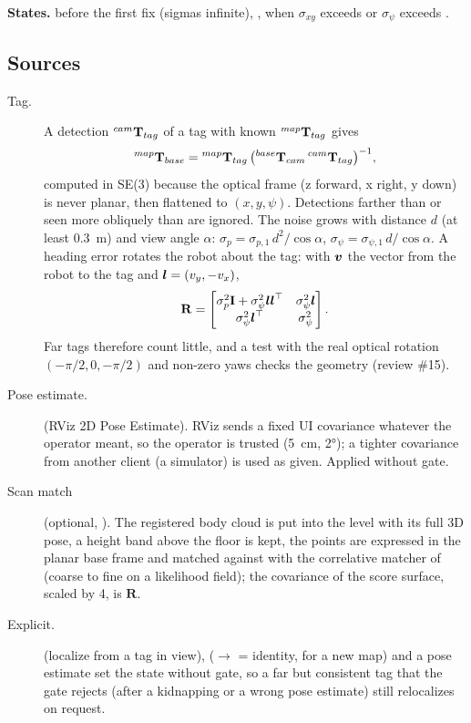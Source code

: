 \textbf{States.}  before the first fix (sigmas infinite), ,
 when $\sigma_{xy}$ exceeds  or $\sigma_\psi$
exceeds .

\subsection{Sources}

\begin{description}
  \item[Tag.] A detection ${}^{cam}\mathbf{T}_{tag}$ of a tag with known ${}^{map}\mathbf{T}_{tag}$ gives
    \begin{equation}
      {}^{map}\mathbf{T}_{base} = {}^{map}\mathbf{T}_{tag}\,\big({}^{base}\mathbf{T}_{cam}\,{}^{cam}\mathbf{T}_{tag}\big)^{-1},
    \end{equation}
    computed in SE(3) because the optical frame (z forward, x right, y down) is never planar,
    then flattened to $(x, y, \psi)$. Detections farther than  or
    seen more obliquely than  are ignored. The noise grows with
    distance $d$ (at least 0.3~m) and view angle $\alpha$:
    $\sigma_p = \sigma_{p,1}\,d^2/\cos\alpha$, $\sigma_\psi = \sigma_{\psi,1}\,d/\cos\alpha$.
    A heading error rotates the robot about the tag: with $\boldsymbol{v}$ the vector from the robot
    to the tag and $\boldsymbol{l} = (v_y, -v_x)$,
    \begin{equation}
      \mathbf{R} = \begin{bmatrix} \sigma_p^2\mathbf{I} + \sigma_\psi^2\boldsymbol{l}\boldsymbol{l}^\top &
      \sigma_\psi^2\boldsymbol{l} \\ \sigma_\psi^2\boldsymbol{l}^\top & \sigma_\psi^2 \end{bmatrix}.
    \end{equation}
    Far tags therefore count little, and a test with the real optical rotation
    $(-\pi/2, 0, -\pi/2)$ and non-zero yaws checks the geometry (review \#15).
  \item[Pose estimate.]  (RViz 2D Pose Estimate). RViz sends a fixed UI
    covariance whatever the operator meant, so the operator is trusted (5~cm, 2°); a tighter
    covariance from another client (a simulator) is used as given. Applied without gate.
  \item[Scan match] (optional, ). The registered body cloud is put
    into the level  with its full 3D pose, a height band above the floor is kept, the
    points are expressed in the planar base frame and matched against  with the
    correlative matcher of ~\cite{olson2009csm} (coarse to fine on a
    likelihood field); the covariance of the score surface, scaled by 4, is $\mathbf{R}$.
  \item[Explicit.]  (localize from a tag in view),
     ($\to$ = identity, for a new map) and
    a pose estimate set the state without gate, so a far but consistent tag that the gate
    rejects (after a kidnapping or a wrong pose estimate) still relocalizes on request.
\end{description}

